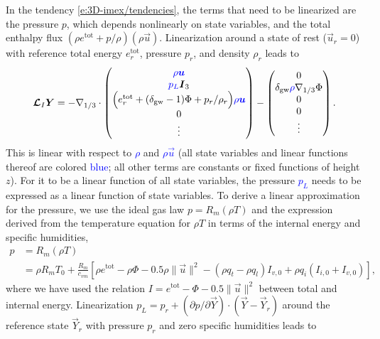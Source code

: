 \documentclass{report}
\begin{document}
In the tendency \eqref{e:3D-imex/tendencies}, the terms that need to be linearized are the pressure $p$, which depends nonlinearly on state variables, and the total enthalpy flux $(\rho e^{\mathrm{tot}} + p/\rho) (\rho \vec{u})$. Linearization around a state of rest ($\vec{u}_r=0$) with reference total energy $e^{\mathrm{tot}}_r$, pressure $p_r$, and density $\rho_r$ leads to
 \begin{equation}\label{e:IMEX_linear}
 \vec{\mathcal{L}}_I \vec{Y} = 
 -\nabla_{1/3} \cdot \begin{pmatrix}
 \textcolor{blue}{\rho \vec{u}} \\
 \textcolor{blue}{p_L} \vec{I}_3  \\
 \Bigl(e^{\mathrm{tot}}_r  + (\delta_{\mathrm{gw}}-1)\Phi + p_r/\rho_r \Bigr) \textcolor{blue}{\rho \vec{u}}\\
 0\\
\vdots
\end{pmatrix}
-
\begin{pmatrix}
0 \\
\delta_{\mathrm{gw}} \textcolor{blue} \rho \nabla_{1/3} \Phi \\
0\\
0\\
\vdots
\end{pmatrix}.
\end{equation}
This is linear with respect to \textcolor{blue}{$\rho$} and \textcolor{blue}{$\rho \vec{u}$} (all state variables and linear functions thereof are colored \textcolor{blue}{blue}; all other terms are constants or fixed functions of height $z$). For it to be a linear function of all state variables, the pressure \textcolor{blue}{$p_L$} needs to be expressed as a linear function of state variables. To derive a linear approximation for the pressure, we use the ideal gas law $p = R_m (\rho T)$ and the expression derived from the temperature equation 
for $\rho T$ in terms of the internal energy and specific humidities,
\begin{equation}\label{e:pressure}
\begin{split}
p &= R_m (\rho T) \\
  &= \rho R_m T_0 + \frac{R_m}{c_{vm}} \left[\rho e^{\mathrm{tot}} - \rho \Phi - 0.5 \rho \|\vec{u}\|^2 - (\rho q_t - \rho q_l) I_{v,0} + \rho q_i (I_{i,0} + I_{v,0}) \right],
\end{split}
\end{equation}
where we have used the relation $I = e^{\mathrm{tot}} - \Phi - 0.5 \|\vec{u}\|^2$ between total and internal energy. Linearization $p_L = p_r + (\partial p/\partial\vec{Y})\cdot(\vec{Y}-\vec{Y}_r)$ around the reference state $\vec{Y}_r$ with pressure $p_r$ and zero specific humidities leads to 
\end{document}
